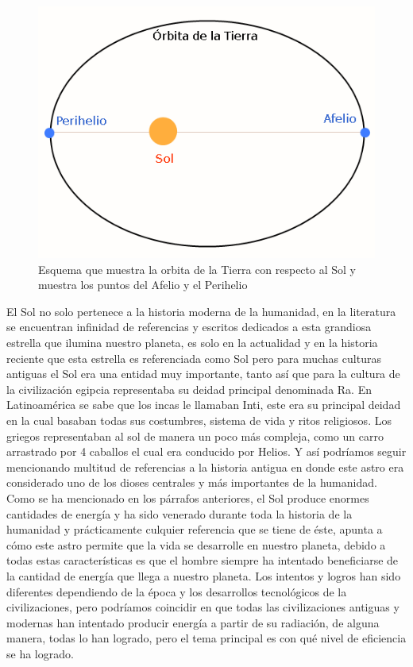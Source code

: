\begin{figure}[h!]
        \centering
        \includegraphics[scale=0.5]{images/afelioPerihelio}
        \caption{ Esquema que muestra la orbita de la Tierra con respecto al Sol y muestra los puntos del Afelio y el Perihelio}
\end{figure}

El Sol no solo pertenece a la historia moderna de la humanidad, en la literatura se encuentran infinidad de referencias y escritos dedicados a esta grandiosa estrella que ilumina nuestro planeta, es solo en la actualidad y en la historia reciente que esta estrella es referenciada como Sol pero para muchas culturas antiguas el Sol era una entidad muy importante, tanto así que para la cultura de la civilización egipcia representaba su deidad principal denominada Ra. En Latinoamérica se sabe que los incas le llamaban Inti, este era su principal deidad en la cual basaban todas sus costumbres, sistema de vida y ritos religiosos. Los griegos representaban al sol de manera un poco más compleja, como un carro arrastrado por 4 caballos el cual era conducido por Helios. Y así podríamos seguir mencionando multitud de referencias a la historia antigua en donde este astro era considerado uno de los dioses centrales y más importantes de la humanidad.\\ 

Como se ha mencionado en los párrafos anteriores, el Sol produce enormes cantidades de energía y ha sido venerado durante toda la historia de la humanidad y prácticamente culquier referencia que se tiene de éste, apunta a cómo este astro permite que la vida se desarrolle en nuestro planeta, debido a todas estas características es que el hombre siempre ha intentado beneficiarse de la cantidad de energía que llega a nuestro planeta. Los intentos y logros han sido diferentes dependiendo de la época y los desarrollos tecnológicos de la civilizaciones, pero podríamos coincidir en que todas las civilizaciones antiguas y modernas han intentado producir energía a partir de su radiación, de alguna manera, todas lo han logrado, pero el tema principal es con qué nivel de eficiencia se ha logrado.\\

